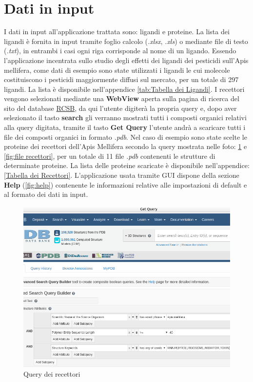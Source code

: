 \section{Dati in input}
I dati in input all'applicazione trattata sono: ligandi e proteine.\newline
La lista dei ligandi è fornita in input tramite foglio calcolo (\textit{.xlsx}, \textit{.xls}) o mediante file di testo (\textit{.txt}), 
in entrambi i casi ogni riga corrisponde al nome di un ligando. Essendo l'applicazione incentrata sullo studio degli effetti dei ligandi dei pesticidi sull'Apis mellifera, come dati di esempio sono state utilizzati i ligandi le cui molecole costituiscono i pesticidi maggiormente diffusi sul mercato, per un totale di 297 ligandi. La lista è disponibile nell'appendice \ref{tab:Tabella dei Ligandi}.\newline
I recettori vengono selezionati mediante una \textbf{WebView} aperta sulla pagina di ricerca del sito del database \href{https://www.rcsb.org/search}{RCSB}, da qui l'utente digiterà la propria query e, dopo aver selezionato il  tasto \textbf{search} gli verranno mostrati tutti i composti organici relativi alla query digitata, tramite il tasto \textbf{Get Query} l'utente andrà a scaricare tutti i file  dei composti organici in formato \textit{.pdb}.\newline
Nel caso di esempio sono state scelte le proteine dei recettori dell'Apis Mellifera secondo la query mostrata nelle foto: \ref{fig:query recettori} e \ref{fig:file recettori}, per un totale di 11 file \textit{.pdb} contenenti le strutture di determinate proteine. La lista delle proteine scaricate è disponibile nell'appendice: \ref{Tabella dei Recettori}. L'applicazione usata tramite GUI dispone della sezione \textbf{Help} (\ref{fig:help}) contenente le informazioni relative alle impostazioni di default e al formato dei dati in input.

\begin{figure}[H]
    \centering
    \includegraphics[scale=0.57]{immagini/capitolo3/queryRecettori.png}
    \caption{Query dei recettori}
    \label{fig:query recettori}
\end{figure}

